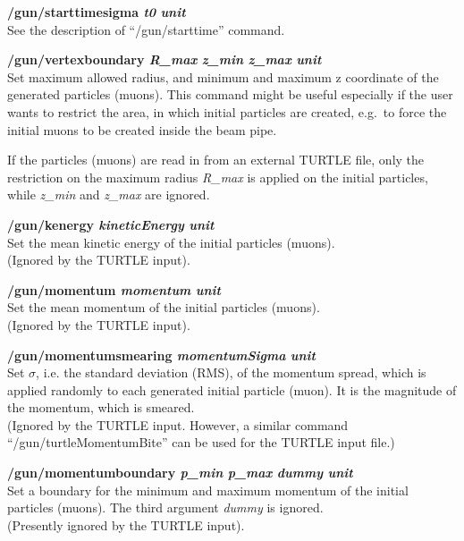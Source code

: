 \documentclass[twoside]{dis04}
\begin{document}
\begin{description}
\item{\bf /gun/starttimesigma \emph{t0} \emph{unit}}\\
	See the description of ``/gun/starttime'' command.

\item{\bf /gun/vertexboundary \emph{R\_max} \emph{z\_min} \emph{z\_max} \emph{unit}}\\
	Set maximum allowed radius, and minimum and maximum z coordinate of the generated particles (muons).
	This command might be useful especially if the user wants to restrict the
	area, in which initial particles are created, e.g.\ to force the initial muons
        to be created inside the beam pipe.

	If the particles (muons) are read in from an external TURTLE file, 
	only the restriction on the maximum radius \emph{R\_max}
	is applied on the initial particles, while \emph{z\_min} and \emph{z\_max} are ignored.

\item{\bf /gun/kenergy \emph{kineticEnergy} \emph{unit}}\\
	Set the mean kinetic energy of the initial particles (muons).\\
	(Ignored by the TURTLE input).	

\item{\bf /gun/momentum \emph{momentum} \emph{unit}}\\
	Set the mean momentum of the initial particles (muons).\\
	(Ignored by the TURTLE input).	

\item{\bf /gun/momentumsmearing  \emph{momentumSigma} \emph{unit}}\\
	Set $\sigma$, i.e. the standard deviation (RMS), of the momentum spread, which
        is applied randomly to each generated initial particle (muon). It is the magnitude
	of the momentum, which is smeared. \\
	(Ignored by the TURTLE input.  However,
	a similar command ``/gun/turtleMomentumBite'' can be used for the TURTLE input file.)

\item{\bf /gun/momentumboundary \emph{p\_min} \emph{p\_max} \emph{dummy} \emph{unit}}\\
	Set a boundary for the minimum and maximum momentum of the initial particles (muons).
	The third argument \emph{dummy} is ignored.\\
	(Presently ignored by the TURTLE input).


\end{description}
\end{document}
